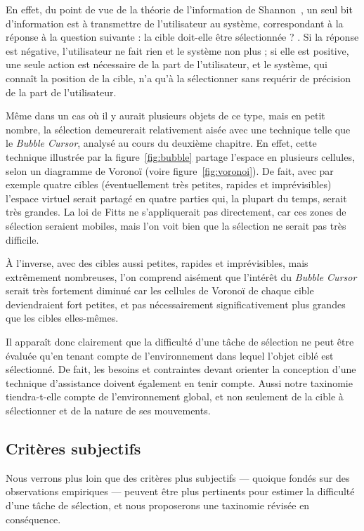 	En effet, du point de vue de la théorie de l'information de Shannon~\cite{shannon2001mathematical}, un seul bit d'information est à transmettre de l'utilisateur au système, correspondant à la réponse à la question suivante : \og la cible doit-elle être sélectionnée ? \fg{}. Si la réponse est négative, l'utilisateur ne fait rien et le système non plus ; si elle est positive, une seule action est nécessaire de la part de l'utilisateur, et le système, qui connaît la position de la cible, n'a qu'à la sélectionner sans requérir de précision de la part de l'utilisateur.
	
	Même dans un cas où il y aurait plusieurs objets de ce type, mais en petit nombre, la sélection demeurerait relativement aisée avec une technique telle que le \emph{Bubble Cursor}, analysé au cours du deuxième chapitre. En effet, cette technique illustrée par la figure~\ref{fig:bubble} partage l'espace en plusieurs cellules, selon un diagramme de Voronoï (voire figure~\ref{fig:voronoi}). De fait, avec par exemple quatre cibles (éventuellement très petites, rapides et imprévisibles) l'espace virtuel serait partagé en quatre parties qui, la plupart du temps, serait très grandes. La loi de Fitts ne s'appliquerait pas directement, car ces zones de sélection seraient mobiles, mais l'on voit bien que la sélection ne serait pas très difficile.
	
	À l'inverse, avec des cibles aussi petites, rapides et imprévisibles, mais extrêmement nombreuses, l'on comprend aisément que l'intérêt du \emph{Bubble Cursor} serait très fortement diminué car les cellules de Voronoï de chaque cible deviendraient fort petites, et pas nécessairement significativement plus grandes que les cibles elles-mêmes.
	
	Il apparaît donc clairement que la difficulté d'une tâche de sélection ne peut être évaluée qu'en tenant compte de l'environnement dans lequel l'objet ciblé est sélectionné. De fait, les besoins et contraintes devant orienter la conception d'une technique d'assistance doivent également en tenir compte. Aussi notre taxinomie tiendra-t-elle compte de l'environnement global, et non seulement de la cible à sélectionner et de la nature de ses mouvements.
	
	\subsection{Critères subjectifs}
	Nous verrons plus loin que des critères plus subjectifs --- quoique fondés sur des observations empiriques --- peuvent être plus pertinents pour estimer la difficulté d'une tâche de sélection, et nous proposerons une taxinomie révisée en conséquence.

